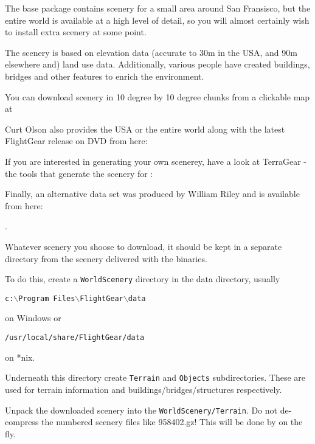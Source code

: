 The \FlightGear{} base package contains scenery for a small area around San Fransisco, but the entire world is available at a high level of detail, so you will almost certainly wish to install extra scenery at some point.

The scenery is based on  elevation data (accurate to 30m in the USA, and 90m elsewhere and)  land use data. Additionally, various people have created buildings, bridges and other features to enrich the environment.

You can download scenery in 10 degree by 10 degree chunks from a clickable map at

\medskip
{}
\medskip

Curt Olson also provides the USA or the entire world along with the latest FlightGear release on DVD from here:

\medskip
{}
\medskip

If you are interested in generating your own scenerey, have a look at TerraGear - the tools that generate the scenery for \FlightGear{}:

\medskip
{}
\medskip

Finally, an alternative data set was produced by William Riley and is available from here:

\medskip
{}.
\medskip

\medskip
Whatever scenery you shoose to download, it should be kept in a separate directory from the scenery delivered with the binaries. 

To do this, create a \texttt{WorldScenery} directory in the \FlightGear{} data directory, usually 

\texttt{c:$\backslash$Program Files$\backslash$FlightGear$\backslash$data} 

\noindent on Windows or 

\texttt{/usr/local/share/FlightGear/data} 

\noindent on *nix.

Underneath this directory create \texttt{Terrain} and \texttt{Objects} subdirectories. These are used for terrain information and buildings/bridges/structures respectively.

Unpack the downloaded scenery into the \texttt{WorldScenery/Terrain}. Do not de-compress the numbered
scenery files like 958402.gz! This will be done by \FlightGear{} on the fly. 

